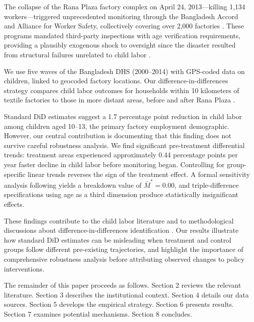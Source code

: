 \documentclass[12pt]{article}
\begin{document}
The collapse of the Rana Plaza factory complex on April 24, 2013---killing 1,134 workers---triggered unprecedented monitoring through the Bangladesh Accord and Alliance for Worker Safety, collectively covering over 2,000 factories \citep{labowitz2015business, donaghey2014reinventing}. These programs mandated third-party inspections with age verification requirements, providing a plausibly exogenous shock to oversight since the disaster resulted from structural failures unrelated to child labor \citep{kabeer2019my}.

We use five waves of the Bangladesh DHS (2000--2014) with GPS-coded data on children, linked to geocoded factory locations. Our difference-in-differences strategy compares child labor outcomes for households within 10 kilometers of textile factories to those in more distant areas, before and after Rana Plaza \citep{heath2018manufacturing, blum2023factories}.

Standard DiD estimates suggest a 1.7 percentage point reduction in child labor among children aged 10--13, the primary factory employment demographic. However, our central contribution is documenting that this finding does not survive careful robustness analysis. We find significant pre-treatment differential trends: treatment areas experienced approximately 0.44 percentage points per year faster decline in child labor before monitoring began. Controlling for group-specific linear trends reverses the sign of the treatment effect. A formal sensitivity analysis following \citet{RambachanRoth2023} yields a breakdown value of $\bar{M}^* = 0.00$, and triple-difference specifications using age as a third dimension produce statistically insignificant effects.

These findings contribute to the child labor literature \citep{edmonds2020globalization, dumas2020child} and to methodological discussions about difference-in-differences identification \citep{RambachanRoth2023, CallawaySantanna2021}. Our results illustrate how standard DiD estimates can be misleading when treatment and control groups follow different pre-existing trajectories, and highlight the importance of comprehensive robustness analysis before attributing observed changes to policy interventions.

The remainder of this paper proceeds as follows. Section 2 reviews the relevant literature. Section 3 describes the institutional context. Section 4 details our data sources. Section 5 develops the empirical strategy. Section 6 presents results. Section 7 examines potential mechanisms. Section 8 concludes.
\end{document}
